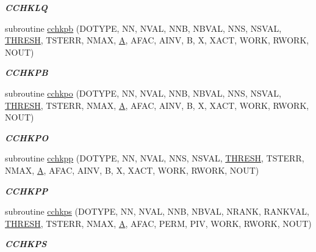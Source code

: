 \begin{DoxyCompactItemize}
\begin{DoxyCompactList}\small\item\em {\bfseries C\+C\+H\+K\+L\+Q} \end{DoxyCompactList}\item 
subroutine \hyperlink{group__complex__lin_ga92bc2724c7185f2beb5df693d53c8b83}{cchkpb} (D\+O\+T\+Y\+P\+E, N\+N, N\+V\+A\+L, N\+N\+B, N\+B\+V\+A\+L, N\+N\+S, N\+S\+V\+A\+L, \hyperlink{zlaqgs_8c_a0656018abfc9fa2821827415f5d5ea57}{T\+H\+R\+E\+S\+H}, T\+S\+T\+E\+R\+R, N\+M\+A\+X, \hyperlink{classA}{A}, A\+F\+A\+C, A\+I\+N\+V, B, X, X\+A\+C\+T, W\+O\+R\+K, R\+W\+O\+R\+K, N\+O\+U\+T)
\begin{DoxyCompactList}\small\item\em {\bfseries C\+C\+H\+K\+P\+B} \end{DoxyCompactList}\item 
subroutine \hyperlink{group__complex__lin_ga5df6e8c7f60bd9af847d4cf1f2c96aad}{cchkpo} (D\+O\+T\+Y\+P\+E, N\+N, N\+V\+A\+L, N\+N\+B, N\+B\+V\+A\+L, N\+N\+S, N\+S\+V\+A\+L, \hyperlink{zlaqgs_8c_a0656018abfc9fa2821827415f5d5ea57}{T\+H\+R\+E\+S\+H}, T\+S\+T\+E\+R\+R, N\+M\+A\+X, \hyperlink{classA}{A}, A\+F\+A\+C, A\+I\+N\+V, B, X, X\+A\+C\+T, W\+O\+R\+K, R\+W\+O\+R\+K, N\+O\+U\+T)
\begin{DoxyCompactList}\small\item\em {\bfseries C\+C\+H\+K\+P\+O} \end{DoxyCompactList}\item 
subroutine \hyperlink{group__complex__lin_ga2d7cfe64f95e756c927b296a15e52190}{cchkpp} (D\+O\+T\+Y\+P\+E, N\+N, N\+V\+A\+L, N\+N\+S, N\+S\+V\+A\+L, \hyperlink{zlaqgs_8c_a0656018abfc9fa2821827415f5d5ea57}{T\+H\+R\+E\+S\+H}, T\+S\+T\+E\+R\+R, N\+M\+A\+X, \hyperlink{classA}{A}, A\+F\+A\+C, A\+I\+N\+V, B, X, X\+A\+C\+T, W\+O\+R\+K, R\+W\+O\+R\+K, N\+O\+U\+T)
\begin{DoxyCompactList}\small\item\em {\bfseries C\+C\+H\+K\+P\+P} \end{DoxyCompactList}\item 
subroutine \hyperlink{group__complex__lin_ga00467bec618b24904b93ab805cacece2}{cchkps} (D\+O\+T\+Y\+P\+E, N\+N, N\+V\+A\+L, N\+N\+B, N\+B\+V\+A\+L, N\+R\+A\+N\+K, R\+A\+N\+K\+V\+A\+L, \hyperlink{zlaqgs_8c_a0656018abfc9fa2821827415f5d5ea57}{T\+H\+R\+E\+S\+H}, T\+S\+T\+E\+R\+R, N\+M\+A\+X, \hyperlink{classA}{A}, A\+F\+A\+C, P\+E\+R\+M, P\+I\+V, W\+O\+R\+K, R\+W\+O\+R\+K, N\+O\+U\+T)
\begin{DoxyCompactList}\small\item\em {\bfseries C\+C\+H\+K\+P\+S} \end{DoxyCompactList}\item 

\end{DoxyCompactItemize}
